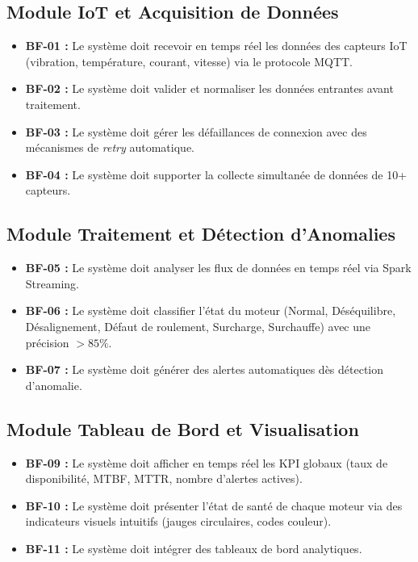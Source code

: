 \documentclass[12pt, a4paper, oneside]{report}
\begin{document}
\subsection{Module IoT et Acquisition de Données}
\begin{itemize}
  \item \textbf{BF-01 :} Le système doit recevoir en temps réel les données des capteurs IoT
  (vibration, température, courant, vitesse) via le protocole MQTT.
  \item \textbf{BF-02 :} Le système doit valider et normaliser les données entrantes avant traitement.
  \item \textbf{BF-03 :} Le système doit gérer les défaillances de connexion avec des mécanismes
  de \textit{retry} automatique.
  \item \textbf{BF-04 :} Le système doit supporter la collecte simultanée de données de 10+ capteurs.
\end{itemize}

\subsection{Module Traitement et Détection d'Anomalies}
\begin{itemize}
  \item \textbf{BF-05 :} Le système doit analyser les flux de données en temps réel via Spark Streaming.
  \item \textbf{BF-06 :} Le système doit classifier l'état du moteur (Normal, Déséquilibre,
  Désalignement, Défaut de roulement, Surcharge, Surchauffe) avec une précision $> 85\%$.
  \item \textbf{BF-07 :} Le système doit générer des alertes automatiques dès détection d'anomalie.
\end{itemize}

\subsection{Module Tableau de Bord et Visualisation}
\begin{itemize}
  \item \textbf{BF-09 :} Le système doit afficher en temps réel les KPI globaux (taux de
  disponibilité, MTBF, MTTR, nombre d'alertes actives).
  \item \textbf{BF-10 :} Le système doit présenter l'état de santé de chaque moteur via des
  indicateurs visuels intuitifs (jauges circulaires, codes couleur).
  \item \textbf{BF-11 :} Le système doit intégrer des tableaux de bord analytiques.
\end{itemize}
\end{document}
